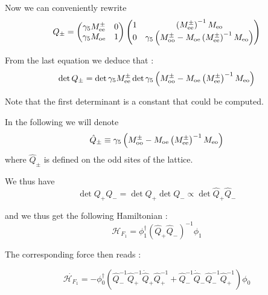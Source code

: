 \documentclass{article}[12pt]
\begin{document}
Now we can conveniently rewrite
\begin{equation}
Q_{\pm} =  \begin{pmatrix}
\gamma_5 M^{\pm}_{\rm{ee}}  & 0 \\ \gamma_5 M_{\rm{oe}} & 1\\
\end{pmatrix} \begin{pmatrix}
1  &  \left(M^{\pm}_{\rm{ee}}\right)^{-1} M_{\rm{eo}} \\0 & \gamma_5
  \left(M^{\pm}_{\rm{oo}} - M_{\rm{oe}}
    \left(M^{\pm}_{\rm{ee}}\right)^{-1} M_{\rm{eo}} \right)\\
\end{pmatrix}
\end{equation}


From the last equation we deduce that :
\begin{equation}
\det{Q_{\pm}} = \det{\gamma_5 M^{\pm}_{\rm{ee}} } \det{\gamma_5
  \left(M^{\pm}_{\rm{oo}} - M_{\rm{oe}}
    \left(M^{\pm}_{\rm{ee}}\right)^{-1} M_{\rm{eo}} \right)}
\end{equation}

Note that the first determinant is a constant that could be computed.

In the following we will denote
\begin{equation}
\hat{Q}_{\pm} \equiv \gamma_5
  \left(M^{\pm}_{\rm{oo}} - M_{\rm{oe}}
    \left(M^{\pm}_{\rm{ee}}\right)^{-1} M_{\rm{eo}} \right)
\end{equation}
where $\hat{Q}_{\pm}$ is defined on the odd sites of the lattice.


We thus have
\begin{equation}
\det{Q_+ Q_-} = \det{Q_+}\det{Q_{-}}\propto\det{\hat{Q}_+ \hat{Q}_-}
\end{equation}

and we thus get the following Hamiltonian :
\begin{equation}
\mathcal{H}_{F_1} = \phi_1^{\dagger} \left(\hat{Q}_+
    \hat{Q}_-\right)^{-1} \phi_1
\end{equation}

The corresponding force then reads :

\begin{equation}
\dot{\mathcal{H}_{F_1}} = - \phi_{0}^\dagger\left(    \hat{Q}_-^{-1}
  \hat{Q}_+^{-1}  \dot{\hat{Q}}_+  \hat{Q}_+^{-1}  + \hat{Q}_{-}^{-1}
  \dot{\hat{Q}}_{-}  \hat{Q}_-^{-1}   \hat{Q}_+^{-1}    \right)    \phi_0
\end{equation}
\end{document}
